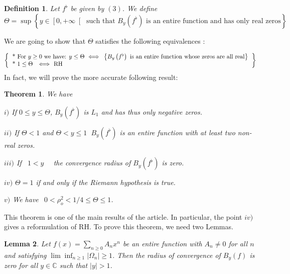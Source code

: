 \documentclass{article}
\newtheorem{theorem}{Theorem}[section]
\newtheorem{definition}{Definition}
\newtheorem{lemma}[theorem]{Lemma}
\begin{document}
\bigskip

\begin{definition}
\bigskip Let $f^{\flat }$ be given by $\left( 3\right) $. We define 
\begin{equation*}
\Theta =\sup \left\{ y\in \left[ 0,+\infty \right[ \text{ such that }B_{y}\left( f^{\flat }\right) \text{ is an entire function and has only real
zeros}\right\} 
\end{equation*}
\end{definition}

\bigskip We are going to show that $\Theta $ satisfies the following
equivalences :

\begin{equation}
\left\{ 
\begin{tabular}{l}
{{*} For }$y\geq 0$ we have: $y\leq \Theta \text{ }\Longleftrightarrow \text{\ }\left\{ B_{y}\left( f^{\flat }\right) \text{ is an entire function whose
zeros are all real}\right\} $ \\ 
{*} $1\leq \Theta $ \ \ $\Longleftrightarrow $ \ RH
\end{tabular}
\right\}
\end{equation}
In fact, we will prove the more accurate following result:

\begin{theorem}
\bigskip We have

$i)$ If $0\leq y\leq \Theta $, $B_{y}\left( f^{\flat }\right) $ is $L_{1}$
and has thus only negative zeros.

$ii)$ If $\Theta <1$ and $\Theta <y\leq 1$ $\ B_{y}\left( f^{\flat }\right) $
is an entire function with at least two non-real zeros.

$iii)$ If \ $1<y$ \ \ the convergence radius of $B_{y}\left( f^{\flat
}\right) $ is zero.

$iv)$ $\Theta =1$ if and only if the Riemann hypothesis is true.

$v)$ We have $\ \ 0<\rho _{o}^{2}<1/4\leq \Theta \leq 1$.
\end{theorem}

\bigskip This theorem is one of the main results of the article. In
particular, the point $iv)$ gives a reformulation of RH. To prove this
theorem, we need two Lemmas.

\begin{lemma}
Let $f\left( x\right) =\sum_{n\geq 0}A_{n}x^{n}$ be an entire function with $A_{n}\neq 0$ for all $n$ and satisfying $\lim \inf_{n\geq 1}\left| \Omega
_{n}\right| \geq 1$. Then the radius of convergence of $B_{y}\left( f\right) 
$ is zero for all $y\in \mathbb{C}$ such that $\left| y\right| >1$.
\end{lemma}
\end{document}
